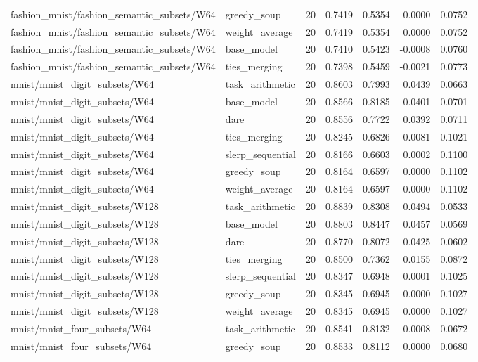 \begin{tabular}{lllrrrr}
fashion\_mnist/fashion\_semantic\_subsets/W64 & greedy\_soup & 20 & 0.7419 & 0.5354 & 0.0000 & 0.0752 \\
fashion\_mnist/fashion\_semantic\_subsets/W64 & weight\_average & 20 & 0.7419 & 0.5354 & 0.0000 & 0.0752 \\
fashion\_mnist/fashion\_semantic\_subsets/W64 & base\_model & 20 & 0.7410 & 0.5423 & -0.0008 & 0.0760 \\
fashion\_mnist/fashion\_semantic\_subsets/W64 & ties\_merging & 20 & 0.7398 & 0.5459 & -0.0021 & 0.0773 \\
mnist/mnist\_digit\_subsets/W64 & task\_arithmetic & 20 & 0.8603 & 0.7993 & 0.0439 & 0.0663 \\
mnist/mnist\_digit\_subsets/W64 & base\_model & 20 & 0.8566 & 0.8185 & 0.0401 & 0.0701 \\
mnist/mnist\_digit\_subsets/W64 & dare & 20 & 0.8556 & 0.7722 & 0.0392 & 0.0711 \\
mnist/mnist\_digit\_subsets/W64 & ties\_merging & 20 & 0.8245 & 0.6826 & 0.0081 & 0.1021 \\
mnist/mnist\_digit\_subsets/W64 & slerp\_sequential & 20 & 0.8166 & 0.6603 & 0.0002 & 0.1100 \\
mnist/mnist\_digit\_subsets/W64 & greedy\_soup & 20 & 0.8164 & 0.6597 & 0.0000 & 0.1102 \\
mnist/mnist\_digit\_subsets/W64 & weight\_average & 20 & 0.8164 & 0.6597 & 0.0000 & 0.1102 \\
mnist/mnist\_digit\_subsets/W128 & task\_arithmetic & 20 & 0.8839 & 0.8308 & 0.0494 & 0.0533 \\
mnist/mnist\_digit\_subsets/W128 & base\_model & 20 & 0.8803 & 0.8447 & 0.0457 & 0.0569 \\
mnist/mnist\_digit\_subsets/W128 & dare & 20 & 0.8770 & 0.8072 & 0.0425 & 0.0602 \\
mnist/mnist\_digit\_subsets/W128 & ties\_merging & 20 & 0.8500 & 0.7362 & 0.0155 & 0.0872 \\
mnist/mnist\_digit\_subsets/W128 & slerp\_sequential & 20 & 0.8347 & 0.6948 & 0.0001 & 0.1025 \\
mnist/mnist\_digit\_subsets/W128 & greedy\_soup & 20 & 0.8345 & 0.6945 & 0.0000 & 0.1027 \\
mnist/mnist\_digit\_subsets/W128 & weight\_average & 20 & 0.8345 & 0.6945 & 0.0000 & 0.1027 \\
mnist/mnist\_four\_subsets/W64 & task\_arithmetic & 20 & 0.8541 & 0.8132 & 0.0008 & 0.0672 \\
mnist/mnist\_four\_subsets/W64 & greedy\_soup & 20 & 0.8533 & 0.8112 & 0.0000 & 0.0680 \\

\end{tabular}
